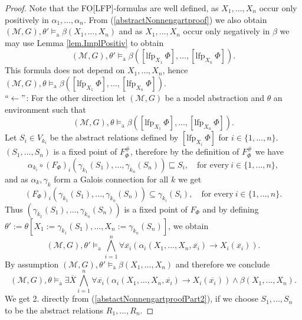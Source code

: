 \documentclass[acmsmall]{acmart}
\theoremstyle{plain}
\theoremstyle{definition}
\newcommand{\calM}{\mathcal{M}}
\newcommand{\mybar}[1]{\overline{#1}}
\newcommand{\impl}{\rightarrow} %
\newcommand{\lfp}{\mathrm{lfp}} %
\newcommand{\modelsa}{\models_\mathrm{a}} %
\begin{document}
\begin{proof}
	Note that the FO[LFP]-formulas are well defined, as $X_1,...,X_n$ occur only positively in $\alpha_1,...,\alpha_n$. From (\ref{abstractNonnengartproof}) we also obtain $(\calM,G),\theta' \modelsa \beta(X_1,...,X_n)$ and as $X_1,...,X_n$ occur only negatively in $\beta$ we may use Lemma \ref{lem.ImplPositiv} to obtain
	\[
	(\calM,G),\theta' \modelsa \beta([\lfp_{X_1} ~\Phi],...,[\lfp_{X_n} ~\Phi]).
	\]
	This formula does not depend on $X_1,...,X_n$, hence$
	(\calM,G),\theta \modelsa \beta([\lfp_{X_1} ~\Phi],...,[\lfp_{X_n} ~\Phi]).
	$\\
	$``\leftarrow"$:  For the other direction let $(\calM,G)$ be a model abstraction and $\theta$ an environment such that
	\[
	(\calM,G),\theta \modelsa \beta([\lfp_{X_1} ~\Phi],...,[\lfp_{X_n} ~\Phi]).
	\]
	Let $S_i \in V_{k_i}$ be the abstract relations defined by $[\lfp_{X_i} ~\Phi]$ for $i \in \{1,...,n\}$. $(S_1,...,S_n)$ is a fixed point of $F_{\Phi}^{\#}$, therefore by the definition of $F_{\Phi}^{\#}$ we have 
	\[
	\alpha_{k_i} \circ (F_{\Phi})_i(\gamma_{k_1}(S_1),...,\gamma_{k_n}(S_n)) \sqsubseteq S_i, \quad \text{for every}~ i \in \{1,...,n\},
	\]
	and as $\alpha_k,\gamma_k$ form a Galois connection for all $k$ we get 
	\[
	(F_{\Phi})_i(\gamma_{k_1}(S_1),...,\gamma_{k_n}(S_n)) \subseteq \gamma_{k_i}(S_i), \quad \text{for every}~ i \in \{1,...,n\}.
	\]
	Thus $(\gamma_{k_1}(S_1),...,\gamma_{k_n}(S_n))$ is a fixed point of $F_{\Phi}$ and by defining $\theta' := \theta[X_1 := \gamma_{k_1}(S_1),...,X_n := \gamma_{k_n}(S_n)]$, we obtain
	\[
	(\calM,G),\theta' \modelsa \bigwedge_{i=1}^n \forall \mybar{x_i} \left(\alpha_i(X_1,...,X_n,\mybar{x_i}) \impl X_i(\mybar{x_i})\right).
	\]
	By assumption $(\calM,G),\theta' \modelsa \beta(X_1,...,X_n)$ and therefore we conclude
	\[
	(\calM,G),\theta \modelsa \exists \mybar{X} \bigwedge_{i=1}^n \forall \mybar{x_i} \left(\alpha_i(X_1,...,X_n,\mybar{x_i}) \impl X_i(\mybar{x_i})\right) \wedge \beta(X_1,...,X_n).
	\]
	We get 2. directly from (\ref{abstactNonnengartproofPart2}), if we choose $S_1,...,S_n$  to be the abstract relations $R_1,...,R_n$.
\end{proof}
\end{document}
